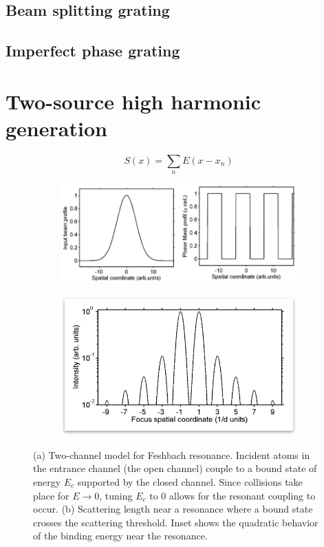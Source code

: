 \subsection{Beam splitting grating}
\subsection{Imperfect phase grating}
\section{Two-source high harmonic generation}


\begin{equation}
\label{eq:field}
S(x) = \sum_{n} E(x - x_{n})
\end{equation}






\begin{figure}
	\centering
	\begin{subfigure}[b]{0.45\textwidth}
		\caption{}
		\includegraphics[width=\textwidth]{figures/Two_source/spatial_profile}
		\label{fig:spatial_profile}
	\end{subfigure}
	\begin{subfigure}[b]{0.45\textwidth}
		\caption{}
		\includegraphics[width=\textwidth]{figures/Two_source/focus_profile}
		\label{fig:focus_profile}
	\end{subfigure}
	\caption{(a) Two-channel model for Feshbach resonance.  Incident atoms in the entrance channel (the open channel) couple to a bound state of energy $E_{c}$ supported by the closed channel.  Since collisions take place for $E\rightarrow 0$, tuning $E_{c}$ to 0 allows for the resonant coupling to occur. (b) Scattering length near a resonance where a bound state crosses the scattering threshold. Inset shows the quadratic behavior of the binding energy near the resonance.}
\end{figure}


